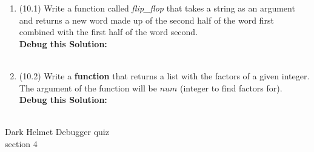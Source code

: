 \documentclass{article}
\begin{document}
\begin{enumerate}
\item (10.1)
		Write a function called \textit{flip\_flop} that takes a string as an argument 
		and returns a new word made up of the second half of the word first combined 
		with the first half of the word second.\\ 

		\textbf{Debug this Solution:}\\
		\mbox{ \hspace*{0.25in}	}

\pagebreak



\item (10.2) 
		Write a \textbf{function} that returns a list with the factors of a given integer. 
		The argument of the function will be $num$ (integer to find factors for).\\

		\textbf{Debug this Solution:}\\
		\mbox{ \hspace*{0.25in}	}

\pagebreak




\end{enumerate}
\pagebreak
Dark Helmet \hfill Debugger quiz\\
section 4\\
\end{document}
